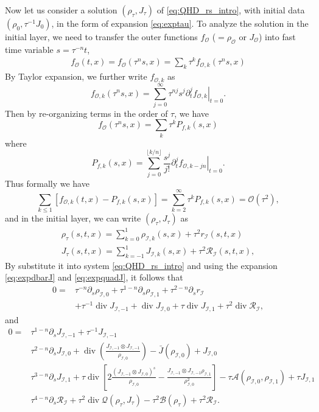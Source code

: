 \documentclass[english]{amsart}
\theoremstyle{plain}
\theoremstyle{definition}
\theoremstyle{remark}
\theoremstyle{plain}
\theoremstyle{plain}
\theoremstyle{plain}
\def\d{{\partial}}
\DeclareMathOperator{\diver}{div}
\numberwithin{equation}{section}
\begin{document}
Now let us consider a solution $(\rho_\tau,J_\tau)$ of \eqref{eq:QHD_rs_intro}, with initial data $(\rho_0,\tau^{-1}J_0)$, in the form of expansion \eqref{eq:exptau}. To analyze the solution in the initial layer, we need to transfer the outer functions $f_{\mathcal{O}}$  ($=\rho_{\mathcal{O}}$ or $J_{\mathcal{O}}$) into fast time variable $s=\tau^{-n}t$,  
\begin{align*}
f_{\mathcal{O}}(t,x)=f_{\mathcal{O}}(\tau^n s,x)=\sum_k \tau^k f_{\mathcal{O},k}(\tau^n s,x)
\end{align*}
By Taylor expansion, we further write $f_{\mathcal{O},k}$ as
\[
f_{\mathcal{O},k}(\tau^n s,x)=\sum_{j=0}^\infty \tau^{nj}s^j\left.\d_t^j f_{\mathcal{O},k}\right|_{t=0}.
\]
Then by re-organizing terms in the order of $\tau$, we have
\[
f_{\mathcal{O}}(\tau^n s,x)=\sum_k \tau^k P_{f,k}(s,x)
\]
where
\begin{equation}\label{eq:match}
    P_{f,k}(s,x)=\sum_{j=0}^{\lfloor k/n\rfloor}\frac{s^j}{j!}\left.\d_t^j f_{\mathcal{O},k-jn}\right|_{t=0}.
\end{equation}
Thus formally we have
\[
\sum_{k\leq 1}\left[f_{\mathcal{O},k}(t,x)-P_{f,k}(s,x)\right]=\sum_{k=2}^\infty \tau^k P_{f,k}(s,x)=\mathcal{O}(\tau^2),
\]
and in the initial layer, we can write $(\rho_\tau,J_\tau)$ as
\[
\begin{aligned}
\rho_\tau(s,t,x)=\sum_{k=0}^1\rho_{\mathcal{I},k}\left(s,x\right)+\tau^2 r_\mathcal{I}(s,t,x)\\
J_\tau(s,t,x)= \sum_{k=-1}^1 J_{\mathcal{I},k}\left(s,x\right)+\tau^2\mathcal{R}_\mathcal{I}(s,t,x),
\end{aligned}
\]
By substitute it into system \eqref{eq:QHD_rs_intro} and using the expansion \eqref{eq:expdbarJ} and \eqref{eq:expquadJ}, it follows that
\begin{equation}\label{eq:inner_rho}
\begin{aligned}
0=&\tau^{- n}\d_s\rho_{\mathcal{I},0}+\tau^{1- n}\d_s\rho_{\mathcal{I},1}+\tau^{2- n}\d_s r_{\mathcal{I}}\\
&+\tau^{-1}\diver J_{\mathcal{I},-1}+\diver J_{\mathcal{I},0}+\tau\diver J_{\mathcal{I},1}+\tau^{2}\diver \mathcal{R}_\mathcal{I},
\end{aligned}
\end{equation}
and
\begin{equation}\label{eq:inner_J}
\begin{aligned}
0=&\tau^{1- n}\d_sJ_{\mathcal{I},-1}+\tau^{-1}J_{\mathcal{I},-1}\\
&\tau^{2- n}\d_sJ_{\mathcal{I},0}+\diver\left(\frac{J_{\mathcal{I},-1}\otimes J_{\mathcal{I},-1}}{\rho_{\mathcal{I},0}}\right)-\bar J(\rho_{\mathcal{I},0})+J_{\mathcal{I},0}\\
&\tau^{3- n}\d_s J_{\mathcal{I},1}+\tau\diver\left[2\frac{(J_{\mathcal{I},-1}\otimes J_{\mathcal{I},0})^s}{\rho_{\mathcal{I},0}}-\frac{J_{\mathcal{I},-1}\otimes J_{\mathcal{I},-1}\rho_{\mathcal{I},1}}{\rho_{\mathcal{I},0}^2}\right]-\tau \mathcal{A}(\rho_{\mathcal{I},0},\rho_{\mathcal{I},1})+\tau J_{\mathcal{I},1}\\
&\tau^{4- n}\d_s\mathcal{R}_\mathcal{I}+\tau^2\diver \mathcal{Q}(\rho_\tau,J_\tau)-\tau^2 \mathcal{B}(\rho_\tau)+\tau^2\mathcal{R}_\mathcal{I}.
\end{aligned}
\end{equation}
\end{document}
